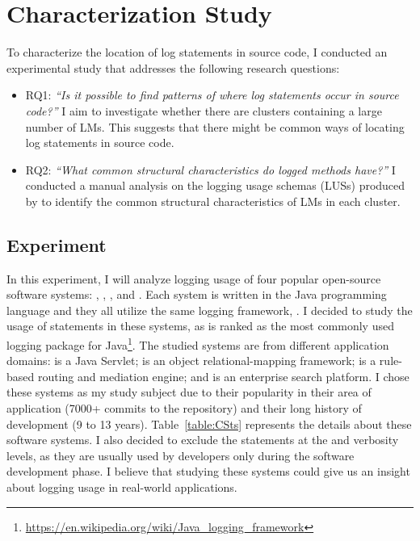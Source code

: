 \chapter{Characterization Study}\label{discover}\label{eval}

To characterize the location of log statements in source code, I conducted an experimental study that addresses the following research questions:

\begin{itemize} [leftmargin=.5in]
\item \textsc{RQ1: }\emph{``Is it possible to find patterns of where log statements occur in source code?''} I aim to investigate whether there are clusters containing a large number of LMs. This suggests that there might be common ways of locating log statements in source code.

\item \textsc{RQ2: }\emph{``What common structural characteristics do logged methods have?''} I conducted a manual analysis on the logging usage schemas (LUSs) produced by  to identify the common structural characteristics of LMs in each cluster.
\end{itemize}


\section{Experiment}  \label{setup-characterization}
In this experiment, I will analyze logging usage of four popular open-source software systems: , , , and . Each system is written in the Java programming language and they all utilize the same logging framework, . I decided to study the usage of  statements in these systems, as  is ranked as the most commonly used logging package for Java\footnote{\url{https://en.wikipedia.org/wiki/Java_logging_framework}}. The studied systems are from different application domains:  is a Java Servlet;  is an object relational-mapping framework;  is a rule-based routing and mediation engine; and  is an enterprise search platform. I chose these systems as my study subject due to their popularity in their area of application (7000+ commits to the  repository) and their long history of development (9 to 13 years). Table~\ref{table:CSts} represents the details about these software systems. I also decided to exclude the  statements at the  and  verbosity levels, as they are usually used by developers only during the software development phase. I believe that studying these systems could give us an insight about logging usage in real-world applications.



